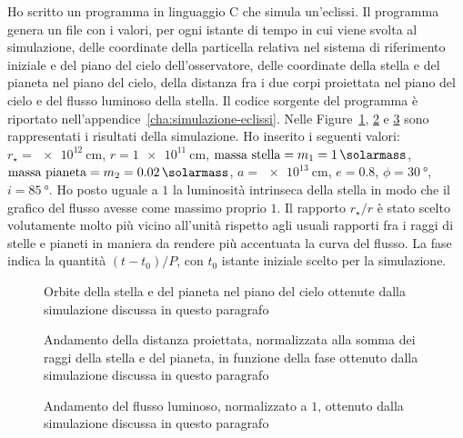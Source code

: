 Ho scritto un programma in linguaggio C che simula un'eclissi. Il programma
genera un file con i valori, per ogni istante di tempo in cui viene svolta al
simulazione, delle coordinate della particella relativa nel sistema di
riferimento iniziale e del piano del cielo dell'osservatore, delle coordinate
della stella e del pianeta nel piano del cielo, della distanza fra i due corpi
proiettata nel piano del cielo e del flusso luminoso della stella. Il codice
sorgente del programma è riportato
nell'appendice~\ref{cha:simulazione-eclissi}. Nelle
Figure~\ref{fig:sim-ecl-piano-cielo}, \ref{fig:sim-ecl-distanza-proiettata} e
\ref{fig:sim-ecl-flusso} sono rappresentati i risultati della simulazione. Ho
inserito i seguenti valori: $r_\star = \SI{e12}{\centi\metre}$,
$r = \SI{1e11}{\centi\metre}$, $\text{massa stella} = m_1 = \SI{1}{\solarmass}$,
$\text{massa pianeta} = m_2 = \SI{0.02}{\solarmass}$,
$a = \SI{e13}{\centi\metre}$, $e = 0.8$, $\phi = \SI{30}{\degree}$,
$i = \SI{85}{\degree}$. Ho posto uguale a $1$ la luminosità intrinseca della
stella in modo che il grafico del flusso avesse come massimo proprio $1$. Il
rapporto $r_\star / r$ è stato scelto volutamente molto più vicino all'unità
rispetto agli usuali rapporti fra i raggi di stelle e pianeti in maniera da
rendere più accentuata la curva del flusso. La fase indica la quantità $(t -
t_0)/P$, con $t_0$ istante iniziale scelto per la simulazione.

\begin{figure}
  \centering
  
  \caption[Orbite della stella e del pianeta nel piano del cielo]{Orbite della
    stella e del pianeta nel piano del cielo ottenute dalla simulazione discussa
    in questo paragrafo}
  \label{fig:sim-ecl-piano-cielo}
\end{figure}
\begin{figure}
  
  \caption[Distanza proiettata in funzione della fase]{Andamento della distanza
    proiettata, normalizzata alla somma dei raggi della stella e del pianeta, in
    funzione della fase ottenuto dalla simulazione discussa in questo paragrafo}
  \label{fig:sim-ecl-distanza-proiettata}
\end{figure}
\begin{figure}
  
  \caption[Flusso luminoso, normalizzato a $1$, di un sistema binario a
  eclissi]{Andamento del flusso luminoso, normalizzato a $1$, ottenuto dalla
    simulazione discussa in questo paragrafo}
  \label{fig:sim-ecl-flusso}
\end{figure}

